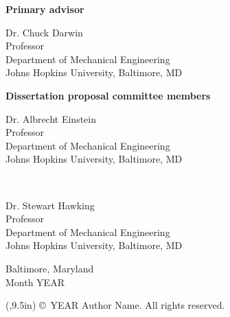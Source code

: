 \begin{center}
    \textbf{Primary advisor}
    
    Dr. Chuck Darwin \\
    Professor \\
    Department of Mechanical Engineering \\
    Johns Hopkins University, Baltimore, MD
\end{center}

\vspace{0.5in}
\centerline{\textbf{Dissertation proposal committee members}}

\begin{minipage}[t]{0.5\textwidth}
	\begin{flushleft}
	Dr. Albrecht Einstein \\
    Professor \\
    Department of Mechanical Engineering \\
    Johns Hopkins University, Baltimore, MD
	\end{flushleft}
\end{minipage}
~
\begin{minipage}[t]{0.5\textwidth}
	\begin{flushleft}
    Dr. Stewart Hawking \\
    Professor \\
    Department of Mechanical Engineering \\
    Johns Hopkins University, Baltimore, MD 
	\end{flushleft}
\end{minipage}


\vspace{0.75in}                     %



\begin{center}
    Baltimore, Maryland \\          %
    Month YEAR                      %
    
    {\begin{textblock*}{\textwidth}(\GlobalMargin,9.5in)
        \copyright\ YEAR Author Name. All rights reserved.
    \end{textblock*}
    \null}
\end{center}

